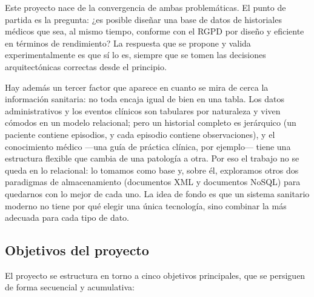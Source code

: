 \documentclass[../main.tex]{subfiles}
\begin{document}
Este proyecto nace de la convergencia de ambas problemáticas. El punto de partida es la pregunta: ¿es posible diseñar una base de datos de historiales médicos que sea, al mismo tiempo, conforme con el RGPD por diseño y eficiente en términos de rendimiento? La respuesta que se propone y valida experimentalmente es que sí lo es, siempre que se tomen las decisiones arquitectónicas correctas desde el principio.

Hay además un tercer factor que aparece en cuanto se mira de cerca la información sanitaria: no toda encaja igual de bien en una tabla. Los datos administrativos y los eventos clínicos son tabulares por naturaleza y viven cómodos en un modelo relacional; pero un historial completo es jerárquico (un paciente contiene episodios, y cada episodio contiene observaciones), y el conocimiento médico ---una guía de práctica clínica, por ejemplo--- tiene una estructura flexible que cambia de una patología a otra. Por eso el trabajo no se queda en lo relacional: lo tomamos como base y, sobre él, exploramos otros dos paradigmas de almacenamiento (documentos XML y documentos NoSQL) para quedarnos con lo mejor de cada uno. La idea de fondo es que un sistema sanitario moderno no tiene por qué elegir una única tecnología, sino combinar la más adecuada para cada tipo de dato.

\subsection{Objetivos del proyecto}

El proyecto se estructura en torno a cinco objetivos principales, que se persiguen de forma secuencial y acumulativa:
\end{document}
